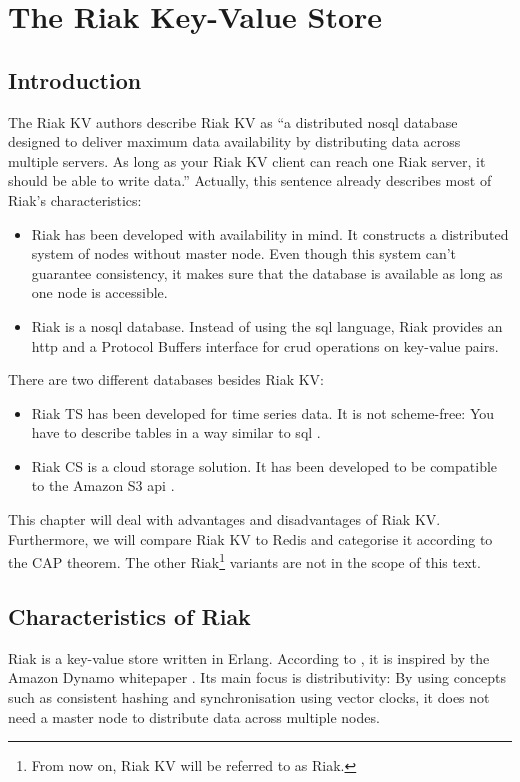 \section{The Riak Key-Value Store}

\subsection{Introduction}
The Riak KV authors describe Riak KV as \enquote{a distributed \gls{nosql} database designed to deliver maximum data availability by distributing data across multiple servers. As long as your Riak KV client can reach one Riak server, it should be able to write data.} \parencite{RiakKV} Actually, this sentence already describes most of Riak's characteristics:
\begin{itemize}
	\item Riak has been developed with availability in mind. It constructs a distributed system of nodes without master node. Even though this system can't guarantee consistency, it makes sure that the database is available as long as one node is accessible.
	\item Riak is a \gls{nosql} database. Instead of using the \gls{sql} language, Riak provides an \gls{http} \parencite{RiakKVHTTP} and a Protocol Buffers \parencite{RiakKVProtoBuf} interface for \gls{crud} operations on key-value pairs.
\end{itemize}

There are two different databases besides Riak KV:
\begin{itemize}
	\item Riak TS has been developed for time series data. It is not scheme-free: You have to describe tables in a way similar to \gls{sql} \parencite{RiakTS}.
	\item Riak CS is a cloud storage solution. It has been developed to be compatible to the Amazon S3 \gls{api} \parencite{RiakCS}.
\end{itemize}

This chapter will deal with advantages and disadvantages of Riak KV. Furthermore, we will compare Riak KV to Redis and categorise it according to the CAP theorem. The other Riak\footnote{From now on, Riak KV will be referred to as Riak.} variants are not in the scope of this text.

\subsection{Characteristics of Riak}
Riak is a key-value store written in Erlang. According to \textcite{Kuznetsov2014}, it is inspired by the Amazon Dynamo whitepaper \parencite{DeCandia2007}. Its main focus is distributivity: By using concepts such as consistent hashing and synchronisation using vector clocks, it does not need a master node to distribute data across multiple nodes.

